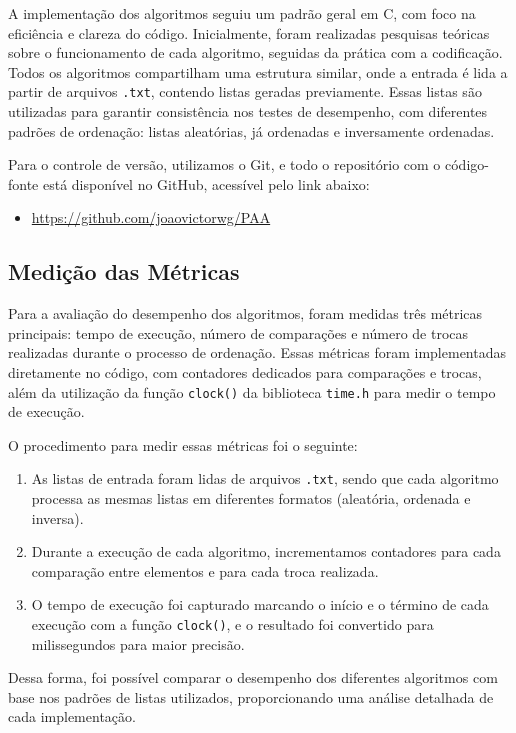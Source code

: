 \documentclass[a4paper,12pt]{article}
\begin{document}
A implementação dos algoritmos seguiu um padrão geral em C, com foco na eficiência e clareza do código. Inicialmente, foram realizadas pesquisas teóricas sobre o funcionamento de cada algoritmo, seguidas da prática com a codificação. Todos os algoritmos compartilham uma estrutura similar, onde a entrada é lida a partir de arquivos \texttt{.txt}, contendo listas geradas previamente. Essas listas são utilizadas para garantir consistência nos testes de desempenho, com diferentes padrões de ordenação: listas aleatórias, já ordenadas e inversamente ordenadas. 

Para o controle de versão, utilizamos o Git, e todo o repositório com o código-fonte está disponível no GitHub, acessível pelo link abaixo:

\begin{itemize}
    \item \url{https://github.com/joaovictorwg/PAA}
\end{itemize}

\subsection{Medição das Métricas}

Para a avaliação do desempenho dos algoritmos, foram medidas três métricas principais: tempo de execução, número de comparações e número de trocas realizadas durante o processo de ordenação. Essas métricas foram implementadas diretamente no código, com contadores dedicados para comparações e trocas, além da utilização da função \texttt{clock()} da biblioteca \texttt{time.h} para medir o tempo de execução.

O procedimento para medir essas métricas foi o seguinte: 
\begin{enumerate}
    \item As listas de entrada foram lidas de arquivos \texttt{.txt}, sendo que cada algoritmo processa as mesmas listas em diferentes formatos (aleatória, ordenada e inversa).
    \item Durante a execução de cada algoritmo, incrementamos contadores para cada comparação entre elementos e para cada troca realizada.
    \item O tempo de execução foi capturado marcando o início e o término de cada execução com a função \texttt{clock()}, e o resultado foi convertido para milissegundos para maior precisão.
\end{enumerate}

Dessa forma, foi possível comparar o desempenho dos diferentes algoritmos com base nos padrões de listas utilizados, proporcionando uma análise detalhada de cada implementação.
\end{document}

